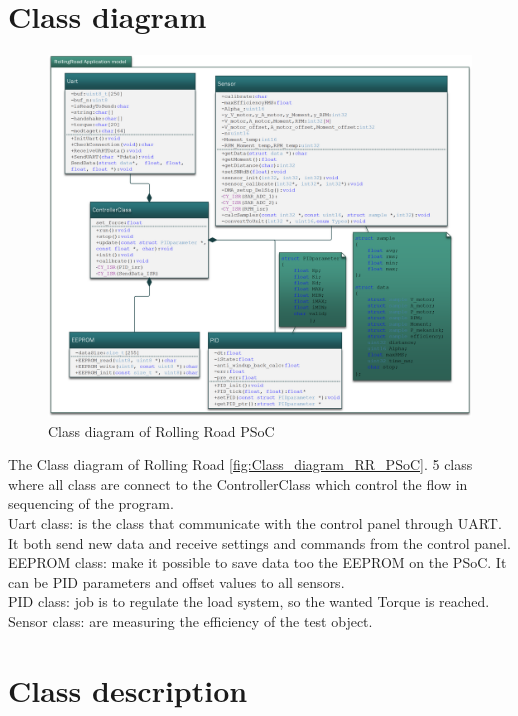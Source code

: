 \section{Class diagram}

\begin{figure}[H]
	\centering
	\includegraphics [width=6in]{Software/Pictures/klassediagram.png}
	\caption{Class diagram of Rolling Road PSoC}
	\label{fig:Class_diagram_RR_PSoC}
\end{figure}

The Class diagram of Rolling Road \vref{fig:Class_diagram_RR_PSoC}. 5 class where all class are connect to the ControllerClass which control the flow in sequencing of the program.\\
Uart class: is the class that communicate with the control panel through UART. It both send new data and receive settings and commands from the control panel. \\
EEPROM class: make it possible to save data too the EEPROM on the PSoC. It can be PID parameters and offset values to all sensors.\\
PID class: job is to regulate the load system, so the wanted Torque is reached. \\
Sensor class: are measuring the efficiency of the test object.

\section{Class description}

